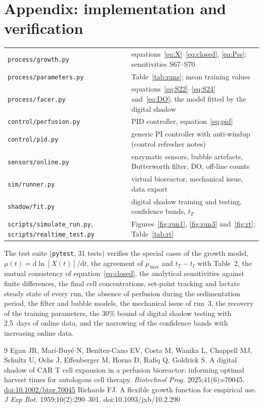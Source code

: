 \documentclass[11pt,a4paper]{article}
\newcommand{\code}[1]{\texttt{#1}}
\newcommand{\dd}{\mathrm{d}}
\newcommand{\mumax}{\mu_{\max}}
\newcommand{\cX}{[X(t)]}
\begin{document}
\section*{Appendix: implementation and verification}
\begin{center}\small
\begin{tabularx}{\textwidth}{@{}l X@{}}
\toprule
\code{process/growth.py} & equations~\eqref{eq:X}--\eqref{eq:closed}, \eqref{eq:Pss}; sensitivities S67--S70 \\
\code{process/parameters.py} & Table~\ref{tab:runs}; mean training values \\
\code{process/facer.py} & equations~\eqref{eq:S22}--\eqref{eq:S24} and~\eqref{eq:DO}; the model fitted by the digital shadow \\
\code{control/perfusion.py} & PID controller, equation~\eqref{eq:pid} \\
\code{control/pid.py} & generic PI controller with anti-windup (control refresher notes) \\
\code{sensors/online.py} & enzymatic sensors, bubble artefacts, Butterworth filter, DO, off-line counts \\
\code{sim/runner.py} & virtual bioreactor, mechanical issue, data export \\
\code{shadow/fit.py} & digital shadow training and testing, confidence bands, $t_T$ \\
\code{scripts/simulate\_run.py}, \code{scripts/realtime\_test.py} & Figures~\ref{fig:run1}, \ref{fig:run3} and~\ref{fig:rt}; Table~\ref{tab:rt} \\
\bottomrule
\end{tabularx}
\end{center}
The test suite (\code{pytest}, 31 tests) verifies the special cases of the growth model,
$\mu(t)=\dd\ln\cX/\dd t$, the agreement of $\mumax$ and $t_T-t_I$ with Table~2, the mutual consistency of
equation~\eqref{eq:closed}, the analytical sensitivities against finite differences, the final cell
concentrations, set-point tracking and lactate steady state of every run, the absence of perfusion
during the sedimentation period, the filter and bubble models, the mechanical issue of run~3, the
recovery of the training parameters, the 30\% bound of digital shadow testing with 2.5~days of online
data, and the narrowing of the confidence bands with increasing online data.

\begin{thebibliography}{9}
 Egan JR, Mar\'i-Buy\'e N, Ben\'itez-Cano EV, Costa M, Wanika L, Chappell MJ,
  Schultz U, Ochs J, Effenberger M, Horna D, Rafiq Q, Goldrick S. A digital shadow of CAR T cell
  expansion in a perfusion bioreactor: informing optimal harvest times for autologous cell therapy.
  \emph{Biotechnol Prog.} 2025;41(6):e70045. \href{https://doi.org/10.1002/btpr.70045}{doi:10.1002/btpr.70045}
 Richards FJ. A flexible growth function for empirical use. \emph{J Exp Bot.}
  1959;10(2):290--301. doi:10.1093/jxb/10.2.290
\end{thebibliography}
\end{document}
